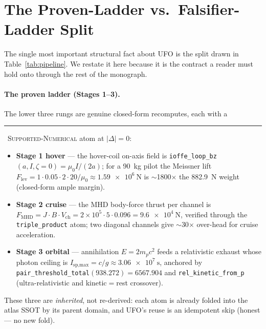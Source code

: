 \documentclass[11pt,a4paper]{article}
\newcommand{\tierdisc}[1]{\textcolor{#1}{\rule[0.05ex]{1.0ex}{1.0ex}}}
\newcommand{\tierGreen}{\tierdisc{green!60!black}}
\begin{document}
\section{The Proven-Ladder vs.\ Falsifier-Ladder Split}
\label{sec:split}

The single most important structural fact about UFO is the split drawn
in Table~\ref{tab:pipeline}. We restate it here because it is the
contract a reader must hold onto through the rest of the monograph.

\paragraph{The proven ladder (Stages 1--3).} The lower three rungs are
genuine closed-form recomputes, each with a \tierGreen\
\textsc{Supported-Numerical} atom at $|\Delta|=0$:
\begin{itemize}\itemsep0.2em
\item \textbf{Stage 1 hover} --- the hover-coil on-axis field is
  \texttt{ioffe\_loop\_bz}$(a,I,\zeta\!=\!0)=\mu_0 I/(2a)$; for a
  \SI{90}{\kilogram} pilot the Meissner lift
  $F_{\text{lev}}=1\!\cdot\!0.05\!\cdot\!2\!\cdot\!20/\mu_0
  \approx\SI{1.59e6}{\newton}$ is $\sim$1800$\times$ the
  \SI{882.9}{\newton} weight (closed-form ample margin).
\item \textbf{Stage 2 cruise} --- the MHD body-force thrust per channel
  is $F_{\text{MHD}}=J\!\cdot\!B\!\cdot\!V_{\text{ch}}
  =2\!\times\!10^5\!\cdot\!5\!\cdot\!0.096=\SI{9.6e4}{\newton}$,
  verified through the \texttt{triple\_product} atom; two diagonal
  channels give $\sim$30$\times$ over-head for cruise acceleration.
\item \textbf{Stage 3 orbital} --- annihilation $E=2m_pc^2$ feeds a
  relativistic exhaust whose photon ceiling is
  $I_{\text{sp,max}}=c/g\approx\SI{3.06e7}{\second}$, anchored by
  \texttt{pair\_threshold\_total}$(938.272)=6567.904$ and
  \texttt{rel\_kinetic\_from\_p} (ultra-relativistic and
  kinetic$=$rest crossover).
\end{itemize}
These three are \emph{inherited}, not re-derived: each atom is already
folded into the atlas SSOT by its parent domain, and UFO's reuse is an
idempotent skip (honest --- no new fold).
\end{document}
